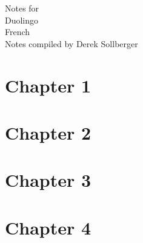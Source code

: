 \documentclass{article} %
\begin{document}

\begin{center}
\Large
Notes for
$$~$$
\Huge
Duolingo
$$~$$
\Large
French
$$~$$
\large
Notes compiled by Derek Sollberger
\end{center}


\pagebreak
{}
\tableofcontents


\pagebreak
{}
\section{Chapter 1}



\pagebreak
{}
\section{Chapter 2}



\pagebreak
{}
\section{Chapter 3}



\pagebreak
{}
\section{Chapter 4}





%

\normalsize

%
%
\end{document}
